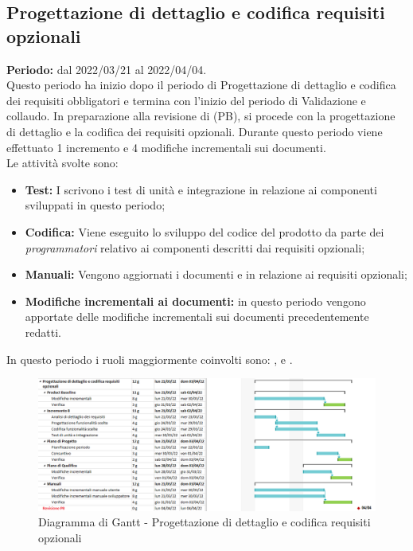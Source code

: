 \subsection{Progettazione di dettaglio e codifica requisiti opzionali} \label{subsection:pianificazione_requisiti_opzionali}
\textbf{Periodo:} dal 2022/03/21 al 2022/04/04.
\bigskip
\\Questo periodo ha inizio dopo il periodo di Progettazione di dettaglio e codifica dei requisiti obbligatori e termina con l'inizio del periodo di Validazione e collaudo.
In preparazione alla revisione di \PB (PB\glo), si procede con la progettazione di dettaglio e la codifica dei requisiti opzionali.
Durante questo periodo viene effettuato 1 incremento e 4 modifiche incrementali sui documenti. 
\\Le attività svolte sono:
\begin{itemize}
  \item \textbf{Test:} I \roleProgrammerLow{} scrivono i test di unità e integrazione in relazione ai componenti sviluppati in questo periodo;
  \item \textbf{Codifica:} Viene eseguito lo sviluppo del codice del prodotto da parte dei \textit{programmatori} relativo ai componenti descritti dai requisiti opzionali;
  \item \textbf{Manuali:} Vengono aggiornati i documenti \docNameVersionMU{} e \docNameVersionMS{} in relazione ai requisiti opzionali;
  \item \textbf{Modifiche incrementali ai documenti:} in questo periodo vengono apportate delle modifiche incrementali sui documenti precedentemente redatti.
 \end{itemize}
 In questo periodo i ruoli maggiormente coinvolti sono: \roleDesignerLow{}, \roleProgrammerLow{} e \roleVerifierLow{}.
 \bigskip
 \begin{figure}[H]
  \centering
   \includegraphics[scale=0.56]{immagini/prog_requisiti_opzionali.png}
   \caption{Diagramma di Gantt - Progettazione di dettaglio e codifica requisiti opzionali}
  \end{figure}
  \pagebreak

